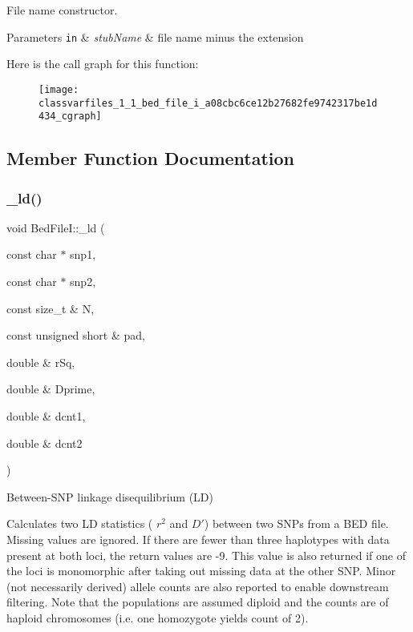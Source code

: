 File name constructor. 


\begin{DoxyParams}[1]{Parameters}
\mbox{\tt in}  & {\em stub\+Name} & file name minus the extension \\
\hline
\end{DoxyParams}
Here is the call graph for this function\+:\nopagebreak
\begin{figure}[H]
\begin{center}
\leavevmode
\texttt{[image: classvarfiles\_1\_1\_bed\_file\_i\_a08cbc6ce12b27682fe9742317be1d434\_cgraph]}
\end{center}
\end{figure}


\subsection{Member Function Documentation}
\mbox{\label{classvarfiles_1_1_bed_file_i_a9b6f8cbb9ae05056a7cd3d487fb26c30}} 
\subsubsection{\texorpdfstring{\+\_\+ld()}{\_ld()}\hspace{0.1cm}{\footnotesize\ttfamily [1/2]}}
{\footnotesize\ttfamily void Bed\+File\+I\+::\+\_\+ld (\begin{DoxyParamCaption}\item[{const char $\ast$}]{snp1,  }\item[{const char $\ast$}]{snp2,  }\item[{const size\+\_\+t \&}]{N,  }\item[{const unsigned short \&}]{pad,  }\item[{double \&}]{r\+Sq,  }\item[{double \&}]{Dprime,  }\item[{double \&}]{dcnt1,  }\item[{double \&}]{dcnt2 }\end{DoxyParamCaption})\hspace{0.3cm}{\ttfamily [protected]}}



Between-\/\+S\+NP linkage disequilibrium (LD) 

Calculates two LD statistics ( $ r^2 $ and $ D' $) between two S\+N\+Ps from a B\+ED file. Missing values are ignored. If there are fewer than three haplotypes with data present at both loci, the return values are -\/9. This value is also returned if one of the loci is monomorphic after taking out missing data at the other S\+NP. Minor (not necessarily derived) allele counts are also reported to enable downstream filtering. Note that the populations are assumed diploid and the counts are of haploid chromosomes (i.\+e. one homozygote yields count of 2).


